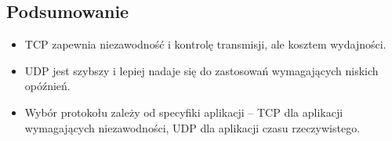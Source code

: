 \subsection{Podsumowanie}
\begin{itemize}
    \item TCP zapewnia niezawodność i kontrolę transmisji, ale kosztem wydajności.
    \item UDP jest szybszy i lepiej nadaje się do zastosowań wymagających niskich opóźnień.
    \item Wybór protokołu zależy od specyfiki aplikacji – TCP dla aplikacji wymagających niezawodności, UDP dla aplikacji czasu rzeczywistego.
\end{itemize}
